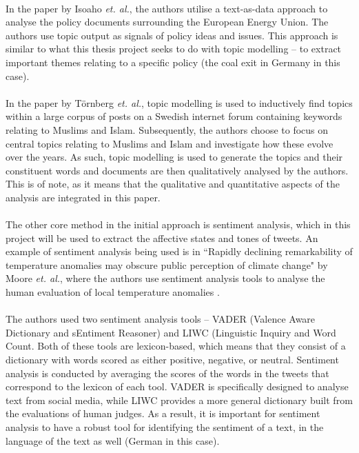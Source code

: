 \documentclass[10pt,twocolumn,letterpaper]{article}
\begin{document}
	\paragraph{} In the paper by Isoaho \emph{et. al.}, the authors utilise a text-as-data approach to analyse the policy documents surrounding the European Energy Union. The authors use topic output as signals of policy ideas and issues. This approach is similar to what this thesis project seeks to do with topic modelling -- to extract important themes relating to a specific policy (the coal exit in Germany in this case). 
	
	\paragraph{} In the paper by Törnberg \emph{et. al.}, topic modelling is used to inductively find topics within a large corpus of posts on a Swedish internet forum containing keywords relating to Muslims and Islam. Subsequently, the authors choose to focus on central topics relating to Muslims and Islam and investigate how these evolve over the years. As such, topic modelling is used to generate the topics and their constituent words and documents are then qualitatively analysed by the authors. This is of note, as it means that the qualitative and quantitative aspects of the analysis are integrated in this paper. 
	
	\paragraph{} The other core method in the initial approach is sentiment analysis, which in this project will be used to extract the affective states and tones of tweets. An example of sentiment analysis being used is in ``Rapidly declining remarkability of temperature anomalies may obscure public perception of climate change" by Moore \emph{et. al.}, where the authors use sentiment analysis tools to analyse the human evaluation of local temperature anomalies \cite{Moore4905}. %
	
	\paragraph{} The authors used two sentiment analysis tools -- VADER (Valence Aware Dictionary and sEntiment Reasoner) and LIWC (Linguistic Inquiry and Word Count. Both of these tools are lexicon-based, which means that they consist of a dictionary with words scored as either positive, negative, or neutral. Sentiment analysis is conducted by averaging the scores of the words in the tweets that correspond to the lexicon of each tool. VADER is specifically designed to analyse text from social media, while LIWC provides a more general dictionary built from the evaluations of human judges. As a result, it is important for sentiment analysis to have a robust tool for identifying the sentiment of a text, in the language of the text as well (German in this case). 
\end{document}
